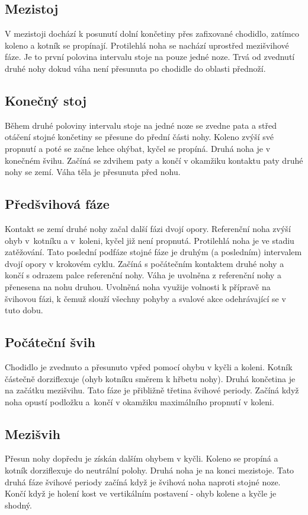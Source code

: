 \subsection{Mezistoj}
V mezistoji dochází k posunutí dolní končetiny přes zafixované chodidlo, zatímco koleno a kotník se propínají. Protilehlá noha se nachází uprostřed mezišvihové fáze. Je to první polovina intervalu stoje na pouze jedné noze. Trvá od zvednutí druhé nohy dokud váha není přesunuta po chodidle do oblasti přednoží. 
\subsection{Konečný stoj}
Během druhé poloviny intervalu stoje na jedné noze se zvedne pata a střed otáčení stojné končetiny se přesune do přední části nohy. Koleno zvýší své propnutí a poté se začne lehce ohýbat, kyčel se propíná. Druhá noha je v konečném švihu. Začíná se zdvihem paty a končí v okamžiku kontaktu paty druhé nohy se zemí. Váha těla je přesunuta před nohu. 
\subsection{Předšvihová fáze}
Kontakt se zemí druhé nohy začal další fázi dvojí opory. Referenční noha zvýší ohyb v~kotníku a v~koleni, kyčel již není propnutá. Protilehlá noha je ve stadiu zatěžování. Tato poslední podfáze stojné fáze je druhým (a posledním) intervalem dvojí opory v krokovém cyklu. Začíná s počátečním kontaktem druhé nohy a končí s odrazem palce referenční nohy. Váha je uvolněna z referenční nohy a přenesena na nohu druhou. Uvolněná noha využije volnosti k přípravě na švihovou fázi, k čemuž slouží všechny pohyby a svalové akce odehrávající se v tuto dobu.
\subsection{Počáteční švih}
Chodidlo je zvednuto a přesunuto vpřed pomocí ohybu v kyčli a koleni. Kotník částečně dorziflexuje (ohyb kotníku směrem k hřbetu nohy). Druhá končetina je na začátku mezišvihu. Tato fáze je přibližně třetina švihové periody. Začíná když noha opustí podložku a~končí v okamžiku maximálního propnutí v koleni.
\subsection{Mezišvih}
Přesun nohy dopředu je získán dalším ohybem v kyčli. Koleno se propíná  a kotník dorziflexuje do neutrální polohy. Druhá noha je na konci mezistoje. Tato druhá fáze švihové periody začíná když je švihová noha  naproti stojné noze. Končí když je holení kost ve vertikálním postavení - ohyb kolene a kyčle je shodný.
